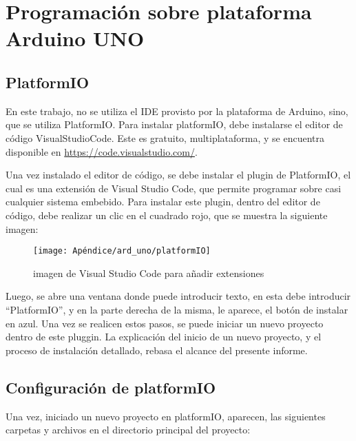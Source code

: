 \renewcommand{\chaptername}{Programación sobre plataforma Arduino UNO}

\chapter{Programación sobre plataforma Arduino UNO} \label{ap:ard_uno_env}
\section{PlatformIO }

En este trabajo, no se utiliza el IDE provisto por la plataforma de Arduino, sino, que se utiliza PlatformIO. Para instalar platformIO, debe instalarse el editor de código VisualStudioCode. Este es gratuito, multiplataforma, y se encuentra disponible en \url{https://code.visualstudio.com/}. 

Una vez instalado el editor de código, se debe instalar el plugin de PlatformIO, el cual es una extensión de Visual Studio Code, que permite programar sobre casi cualquier sistema embebido. Para instalar este plugin, dentro del editor de código, debe realizar un clic en el cuadrado rojo, que se muestra la siguiente imagen: 

\begin{figure}[ht!]
	\hspace{-20mm}
	\texttt{[image: Apéndice/ard\_uno/platformIO]}
	\caption{imagen de Visual Studio Code para añadir extensiones}
	\label{ref:platformIO}
\end{figure} 

Luego, se abre una ventana donde puede introducir texto, en esta debe introducir ``PlatformIO'', y en la parte derecha de la misma, le aparece, el botón de instalar en azul. Una vez se realicen estos pasos, se puede iniciar un nuevo proyecto dentro de este pluggin. La explicación del inicio de un nuevo proyecto, y el proceso de instalación detallado, rebasa el alcance del presente informe. 


\section{Configuración de platformIO}

Una vez, iniciado un nuevo proyecto en platformIO, aparecen, las siguientes carpetas y archivos en el directorio principal del proyecto:
 
